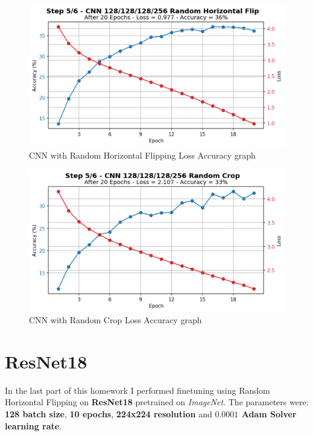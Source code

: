 \documentclass[a4paper, 11pt]{article}
\begin{document}
	\begin{figure}[ht!]
		\centering
		\includegraphics[width=0.65\paperwidth]{img/fig05a.png}
		\caption{CNN with Random Horizontal Flipping Loss Accuracy graph}
		\label{fig:05a}
	\end{figure}
	\begin{figure}[ht!]
		\centering
		\includegraphics[width=0.65\paperwidth]{img/fig05b.png}
		\caption{CNN with Random Crop Loss Accuracy graph}
		\label{fig:05b}
	\end{figure}
	\FloatBarrier	
	
	\section{ResNet18} \label{final}
	
	In the last part of this homework I performed finetuning using Random Horizontal Flipping on \textbf{ResNet18} pretrained on \textit{ImageNet}. The parameters were: \textbf{128 batch size}, \textbf{10 epochs}, \textbf{224x224 resolution} and \textbf{$\boldsymbol{0.0001}$ Adam Solver learning rate}.
	
%	
%	
	
\end{document}
